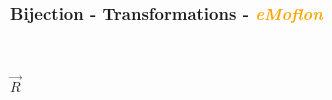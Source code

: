 \documentclass{beamer}
\begin{document}
\begin{frame}
\frametitle{Bijection - \textbf{Transformations} - \textbf{\textit{\textcolor{orange}{eMoflon}}}}
\begin{figure}[ht]
\begin{mdframed}
    \centering
    \mbox{\qquad\qquad\qquad
          }
\end{mdframed}          
    \label{fig:T1}
\end{figure}

\begin{center}
$\overrightarrow{R}$
\end{center}

\begin{figure}[ht]
    \centering
    \mbox{
          }
    \label{fig:T4}
\end{figure}

\end{frame}
\end{document}
